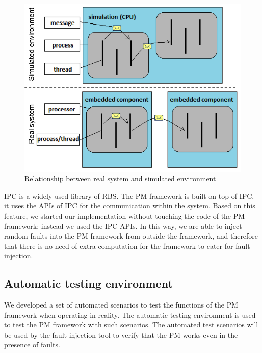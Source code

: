 \begin{figure}[h]
\centering
\includegraphics[width=\columnwidth]{figure/simulationVSembedded.png}
\caption{Relationship between real system and  simulated environment \label{simulationVSembedded}}
\end{figure}

IPC is a widely used library of RBS. The PM framework is built on top of IPC, it uses the APIs of IPC for the communication within the system. Based on this feature, we started our implementation without touching the code of the PM framework; instead we used the IPC APIs. In this way, we are able to inject random faults into the PM framework from outside the framework, and therefore that there is no need of extra computation for the framework to cater for fault injection. %

\subsection{Automatic testing environment}\label{sec:PM}
We developed a set of automated scenarios %
to test the functions of the PM framework %
when operating in reality. %
The automatic testing environment is used to test the PM framework with such scenarios. The automated test scenarios will be used by the fault injection tool to verify that the PM works even in the presence of faults. 

